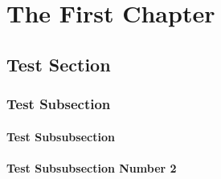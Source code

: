 \documentclass[./thoughthist.tex]{subfiles}
\begin{document}
\chapter{The First Chapter}
\newpage

\section{Test Section}
\Blindtext

\blindtext
\subsection{Test Subsection}
\blindtext

\subsubsection{Test Subsubsection}
\blindtext

\subsubsection{Test Subsubsection Number 2}
\blindtext
\end{document}
